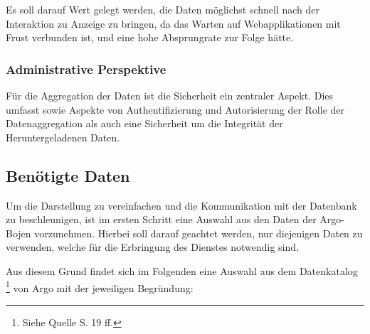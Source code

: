         Es soll darauf Wert gelegt werden, die Daten möglichst schnell nach der Interaktion zu Anzeige zu bringen, da das Warten auf Webapplikationen mit Frust verbunden ist, und eine hohe Absprungrate zur Folge hätte.
        
        
    \subsubsection{Administrative Perspektive}
        Für die Aggregation der Daten ist die Sicherheit ein zentraler Aspekt. Dies umfasst sowie Aspekte von Authentifizierung und Autorisierung der Rolle der Datenaggregation als auch eine Sicherheit um die Integrität der Heruntergeladenen Daten.
    

\subsection{Benötigte Daten}

Um die Darstellung zu vereinfachen und die Kommunikation mit der Datenbank zu beschleunigen, ist im ersten Schritt eine Auswahl aus den Daten der Argo-Bojen vorzunehmen. Hierbei soll darauf geachtet werden, nur diejenigen Daten zu verwenden, welche für die Erbringung des Dienstes notwendig sind.

Aus diesem Grund findet sich im Folgenden eine Auswahl aus dem Datenkatalog \footnote{Siehe Quelle \cite{ArgoUserManual} S. 19 ff.} von Argo mit der jeweiligen Begründung:

